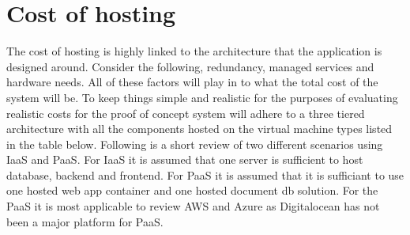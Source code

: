 \documentclass[]{uiophd}
\begin{document}
\section{Cost of hosting}
The cost of hosting is highly linked to the architecture that the application is designed around. Consider the following, redundancy, managed services and hardware needs. All of these factors will play in to what the total cost of the system will be. To keep things simple and realistic for the purposes of evaluating realistic costs for the proof of concept system will adhere to a three tiered architecture with all the components hosted on the virtual machine types listed in the table below. Following is a short review of two different scenarios using IaaS and PaaS. For IaaS it is assumed that one server is sufficient to host database, backend and frontend. For PaaS it is assumed that it is sufficiant to use one hosted web app container and one hosted document db solution. For the PaaS it is most applicable to review AWS and Azure as Digitalocean has not been a major platform for PaaS.
\end{document}
